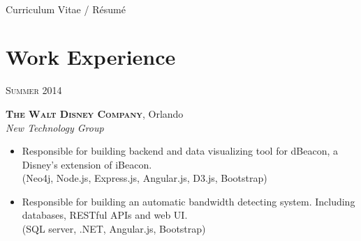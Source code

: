 \documentclass[10pt]{article}
\begin{document}
\color{text1} %


\par{\\[8pt] %
{\color{headings} Curriculum {Vitae / Résumé}\\[15pt]\par} %
	

\begin{minipage}[t]{0.5\textwidth} %
\vspace{0pt} %
	

\section{Work Experience} 

{\raggedleft\textsc{Summer 2014}\par}

{\raggedright\large \textbf{\textsc{The Walt Disney Company}}, Orlando\\
\textit{New Technology Group}\\[5pt]}

\begin{itemize}
	\item Responsible for building backend and data visualizing tool for dBeacon, a Disney's extension of iBeacon. \\
	{\color{Mahogany}(Neo4j, Node.js, Express.js, Angular.js, D3.js, Bootstrap)}
	\item Responsible for building an automatic bandwidth detecting system. Including databases, RESTful APIs and web UI. \\
	{\color{Mahogany}(SQL server, .NET, Angular.js, Bootstrap)}
\end{itemize}


\end{minipage}}
\end{document}

